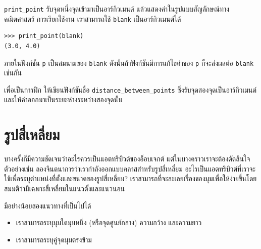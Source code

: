 \verb"print_point" รับจุดหนึ่งจุดเข้ามาเป็นอาร์กิวเมนต์
แล้วแสดงค่าในรูปแบบสัญลักษณ์ทางคณิตศาสตร์ 
การเรียกใช้งาน เราสามารถใช้ {\tt blank} เป็นอาร์กิวเมนต์ได้

\begin{verbatim}
>>> print_point(blank)
(3.0, 4.0)
\end{verbatim}
%

ภายในฟังก์ชัน {\tt p} เป็นสมนามของ {\tt blank} ดังนั้นถ้าฟังก์ชันมีการแก้ไขค่าของ {\tt p} ก็จะส่งผลต่อ {\tt blank} เช่นกัน


เพื่อเป็นการฝึก ให้เขียนฟังก์ชันชื่อ  \verb"distance_between_points" ซึ่งรับจุดสองจุดเป็นอาร์กิวเมนต์และให้ค่าออกมาเป็นระยะห่างระหว่างสองจุดนั้น

\section{รูปสี่เหลี่ยม} %
\label{rectangles}

บางครั้งก็มีความชัดเจนว่าอะไรควรเป็นแอตทริบิวต์ของอ็อบเจกต์ แต่ในบางคราวเราจะต้องตัดสินใจ ตัวอย่างเช่น 
ลองจินตนาการว่าเรากำลังออกแบบคลาสสำหรับรูปสี่เหลี่ยม อะไรเป็นแอตทริบิวต์ที่เราจะใช้เพื่อระบุตำแหน่งที่ตั้งและขนาดของรูปสี่เหลี่ยม? 
เราสามารถที่จะละเลยเรื่องของมุมเพื่อให้ง่ายขึ้นโดยสมมติว่ามีเฉพาะสี่เหลี่ยมในแนวตั้งและแนวนอน



มีอย่างน้อยสองแนวทางที่เป็นไปได้

\begin{itemize}

\item เราสามารถระบุมุมใดมุมหนึ่ง (หรือจุดศูนย์กลาง) ความกว้าง และความยาว

\item เราสามารถระบุคู่จุดมุมตรงข้าม

\end{itemize}

